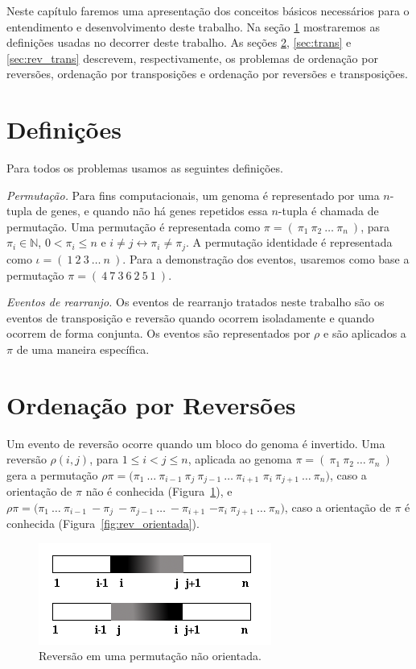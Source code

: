 Neste capítulo faremos uma apresentação dos conceitos básicos
necessários para o entendimento e desenvolvimento deste trabalho. Na
seção \ref{sec:defin} mostraremos as definições usadas no decorrer
deste trabalho. As seções \ref{sec:rev}, \ref{sec:trans}
e \ref{sec:rev_trans} descrevem, respectivamente, os problemas de
ordenação por reversões, ordenação por transposições e ordenação por
reversões e transposições.

\section{Definições}
\label{sec:defin}
Para todos os problemas usamos as seguintes definições.

\textit{Permutação.} 
Para fins computacionais, um genoma é representado por uma $n$-tupla
de genes, e quando não há genes repetidos essa $n$-tupla é chamada de
permutação. Uma permutação é representada como $\pi =
(~\pi_{1}~\pi_{2}~\ldots~\pi_{n}~)$, para $\pi_{i} \in \mathbb{N}$, $0
< \pi_{i} \leq n$ e $i \neq j \leftrightarrow \pi_{i} \neq \pi_{j}$. A
permutação identidade é representada como $\iota =
(~1~2~3~\ldots~n~)$. Para a demonstração dos eventos, usaremos como
base a permutação $\pi = (~4~7~3~6~2~5~1~)$.

\textit{Eventos de rearranjo.}
Os eventos de rearranjo tratados neste trabalho são os eventos de
transposição e reversão quando ocorrem isoladamente e quando ocorrem
de forma conjunta. Os eventos são representados por $\rho$ e são
aplicados a $\pi$ de uma maneira específica.

\section{Ordenação por Reversões}
\label{sec:rev}
Um evento de reversão ocorre quando um bloco do genoma é
invertido. Uma reversão $\rho(i, j)$, para $1 \leq i < j \leq n$,
aplicada ao genoma $\pi = (~\pi_{1}~\pi_{2}~\ldots~\pi_{n}~)$ gera a
permutação $\rho\pi =
(\pi_{1}~\ldots~\pi_{i-1}~\pi_{j}~\pi_{j-1}~\ldots~\pi_{i+1}$
$\pi_{i}~ \pi_{j+1}~\ldots~\pi_{n})$, caso a orientação de $\pi$ não é
conhecida (Figura~\ref{fig:rev_nao_orientada}), e $\rho\pi =
(\pi_{1}~\ldots~\pi_{i-1}~-\pi_{j}~-\pi_{j-1}~\ldots~-\pi_{i+1}$
$-\pi_{i}~ \pi_{j+1}~\ldots~\pi_{n})$, caso a orientação de $\pi$ é
conhecida (Figura~\ref{fig:rev_orientada}). 

\begin{figure}
  \centering
  \includegraphics{images/rev_nao_orientada.png} 
  \caption{Reversão em uma permutação não orientada.}
  \label{fig:rev_nao_orientada}
\end{figure}

